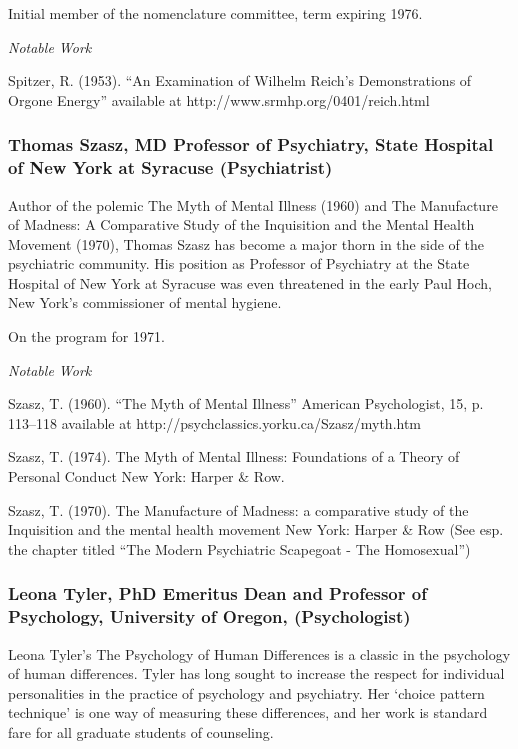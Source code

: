Initial member of the nomenclature committee, term expiring 1976.

\emph{Notable Work}

Spitzer, R. (1953). ``An Examination of Wilhelm Reich's Demonstrations of Orgone Energy'' available at http:\slash \slash www.srmhp.org\slash 0401\slash reich.html

\subsubsection{Thomas Szasz, MD Professor of Psychiatry, State Hospital of New York at Syracuse (Psychiatrist)}
\label{thomasszaszmdprofessorofpsychiatrystatehospitalofnewyorkatsyracusepsychiatrist}

Author of the polemic The Myth of Mental Illness (1960) and The Manufacture of Madness: A Comparative Study of the Inquisition and the Mental Health Movement (1970), Thomas Szasz has become a major thorn in the side of the psychiatric community. His position as Professor of Psychiatry at the State Hospital of New York at Syracuse was even threatened in the early Paul Hoch, New York's commissioner of mental hygiene.

On the program for 1971.

\emph{Notable Work}

Szasz, T. (1960). ``The Myth of Mental Illness'' American Psychologist, 15, p. 113--118 available at http:\slash \slash psychclassics.yorku.ca\slash Szasz\slash myth.htm

Szasz, T. (1974). The Myth of Mental Illness: Foundations of a Theory of Personal Conduct New York: Harper \& Row.

Szasz, T. (1970). The Manufacture of Madness: a comparative study of the Inquisition and the mental health movement New York: Harper \& Row (See esp. the chapter titled ``The Modern Psychiatric Scapegoat - The Homosexual'')

\subsubsection{Leona Tyler, PhD Emeritus Dean and Professor of Psychology, University of Oregon, (Psychologist)}
\label{leonatylerphdemeritusdeanandprofessorofpsychologyuniversityoforegonpsychologist}

Leona Tyler's The Psychology of Human Differences is a classic in the psychology of human differences. Tyler has long sought to increase the respect for individual personalities in the practice of psychology and psychiatry. Her `choice pattern technique' is one way of measuring these differences, and her work is standard fare for all graduate students of counseling.

